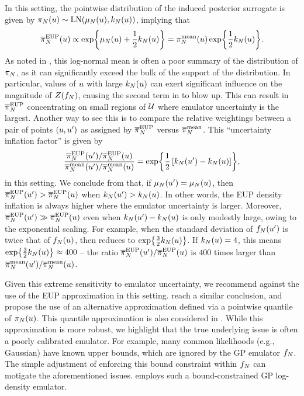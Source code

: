 \documentclass[12pt]{article}
\begin{document}
In this setting, the pointwise distribution of the induced posterior surrogate is given by
$\pi_{N}(u) \sim \mathrm{LN}(\mu_{N}(u), k_{N}(u))$, implying that
\begin{equation}
\overline{\pi}_{N}^{\mathrm{EUP}}(u) 
\propto \exp\mathopen{}\left\{\mu_{N}(u) + \frac{1}{2}k_{N}(u)\right\}\mathclose{}
= \pi_{N}^{\mathrm{mean}}(u) \exp\mathopen{}\left\{\frac{1}{2}k_{N}(u)\right\}\mathclose{}.
\label{eq:EL-Gaussian-fwd}
\end{equation} 
As noted in \citet{VehtariParallelGP}, this log-normal mean is often a poor summary of the 
distribution of $\pi_{N}$, as it can significantly exceed the bulk of the support 
of the distribution. In particular, values of $u$ with large $k_{N}(u)$ can exert significant 
influence on the magnitude of $Z(f_{N})$, causing the second term in 
 to blow up. This can result in $\overline{\pi}_{N}^{\mathrm{EUP}}$ concentrating 
on small regions of $\mathcal{U}$ where emulator uncertainty is the largest. Another 
way to see this is to compare the relative weightings between a pair of points $(u, u^\prime)$
as assigned by $\overline{\pi}_{N}^{\mathrm{EUP}}$ versus $\overline{\pi}_{N}^{\mathrm{mean}}$. This 
``uncertainty inflation factor'' is given by
 \begin{equation}
 \frac{\overline{\pi}_{N}^{\mathrm{EUP}}(u^\prime)/\overline{\pi}_{N}^{\mathrm{EUP}}(u)}{\overline{\pi}_{N}^{\mathrm{mean}}(u^\prime)/\overline{\pi}_{N}^{\mathrm{mean}}(u)}
 = \exp\mathopen{}\left\{\frac{1}{2}\left[k_{N}(u^\prime) - k_{N}(u) \right]\right\}\mathclose{},
 \label{eq:unc-infl-factor}
 \end{equation}
in this setting. We conclude from 
that, if $\mu_{N}(u^\prime) = \mu_{N}(u)$, then 
$\overline{\pi}_{N}^{\mathrm{EUP}}(u^\prime) > \overline{\pi}_{N}^{\mathrm{EUP}}(u)$
when $k_{N}(u^\prime) > k_{N}(u)$. In other words, the EUP density 
inflation is always higher where the emulator uncertainty is larger.
Moreover, 
$\overline{\pi}_{N}^{\mathrm{EUP}}(u^\prime) \gg \overline{\pi}_{N}^{\mathrm{EUP}}(u)$ even when 
$k_{N}(u^\prime) - k_{N}(u)$ is only modestly large, owing to the exponential scaling. 
For example, when the standard deviation of $f_{N}(u^\prime)$ is twice that of $f_{N}(u)$,
then  reduces to $\exp\mathopen{}\left\{\frac{3}{2}k_{N}(u)\right\}\mathclose{}$. If $k_{N}(u) = 4$, this means
$\exp\mathopen{}\left\{\frac{3}{2}k_{N}(u)\right\}\mathclose{} \approx 400$ -- the ratio 
$\overline{\pi}_{N}^{\mathrm{EUP}}(u^\prime)/\overline{\pi}_{N}^{\mathrm{EUP}}(u)$
is $400$ times larger than $\overline{\pi}_{N}^{\mathrm{mean}}(u^\prime)/\overline{\pi}_{N}^{\mathrm{mean}}(u)$.

Given this extreme sensitivity to emulator uncertainty, we recommend against the use of the EUP
approximation in this setting. \citet{VehtariParallelGP} reach a similar conclusion, and propose
the use of an alternative approximation defined via a pointwise quantile of $\pi_{N}(u)$.
This quantile approximation is also considered in \citet{quantileApprox,FATES_CES}.
While this approximation is more robust, we highlight that the true underlying issue is often 
a poorly calibrated emulator. For example, many common likelihoods (e.g., Gaussian) 
have known upper bounds, which are ignored by the GP emulator $f_{N}$. The simple 
adjustment of enforcing this bound constraint within $f_{N}$ can motigate the aforementioned issues.
\citet{quantileApprox} employs such a bound-constrained GP log-density emulator.
\end{document}
